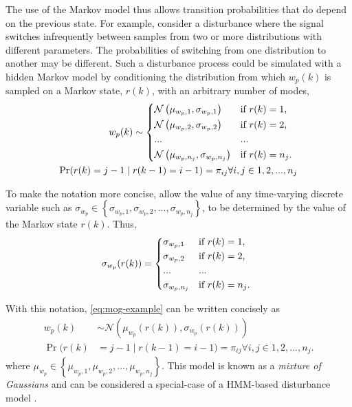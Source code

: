 {The use of the Markov model thus allows transition probabilities that do depend on the previous state. For example, consider a disturbance where the signal switches infrequently between samples from two or more distributions with different parameters. The probabilities of switching from one distribution to another may be different. Such a disturbance process could be simulated with a hidden Markov model by conditioning the distribution from which $w_p(k)$ is sampled on a Markov state, $r(k)$, with an arbitrary number of modes,
%
\begin{equation} \label{eq:mog-example}
	\begin{split}
		w_p(k) \sim 
		\begin{cases*}
			\mathcal{N}\left(\mu_{w_p,1}, \sigma_{w_p,1}\right) & if $r(k)=1$, \\
			\mathcal{N}\left(\mu_{w_p,2}, \sigma_{w_p,2}\right) & if $r(k)=2$, \\
			... & ...\\
			\mathcal{N}\left(\mu_{w_p,n_j}, \sigma_{w_p,n_j}\right) & if $r(k)=n_j$.
		\end{cases*} \\
	\Pr(r(k)=j-1 \mid r(k-1)=i-1)=\pi_{ij} \forall i,j \in {1,2,...,n_j}
	\end{split}
\end{equation}

To make the notation more concise, allow the value of any time-varying discrete variable such as $\sigma_{w_p} \in \left\{\sigma_{w_p,1}, \sigma_{w_p,2},..., \sigma_{w_p,n_j}\right\}$, to be determined by the value of the Markov state $r(k)$. Thus,
\begin{equation} \label{eq:A-selection}
	\sigma_{w_p}(r(k)) = 
	\begin{cases*}
		\sigma_{w_p,1} & if $r(k)=1$, \\
		\sigma_{w_p,2} & if $r(k)=2$, \\
		... & ...\\
		\sigma_{w_p,n_j} & if $r(k)=n_j$.
	\end{cases*}
\end{equation}

With this notation, \eqref{eq:mog-example} can be written concisely as
\begin{equation} \label{eq:mog-example2}
	\begin{aligned}
		w_p(k) &\sim \mathcal{N}\left(\mu_{w_p}(r(k)), \sigma_{w_p}(r(k))\right) \\
		\Pr(r(k) &= j-1 \mid r(k-1)=i-1)=\pi_{ij} \forall i,j \in {1,2,...,n_j}.
	\end{aligned}
\end{equation}
where $\mu_{w_p}\in\left\{\mu_{w_p,1},\mu_{w_p,2},...,\mu_{w_p,n_j}\right\}$. This model is known as a \textit{mixture of Gaussians} and can be considered a special-case of a HMM-based disturbance model \citep{wong_disturbance_2007}.

}
